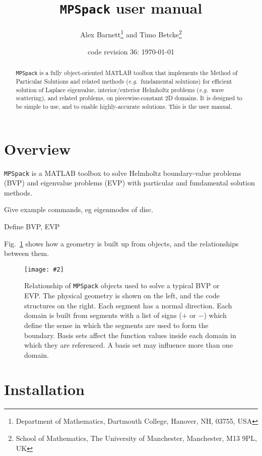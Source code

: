 \documentclass[12pt]{article}
\newcommand{\bfi}{\begin{figure}}
\newcommand{\efi}{\end{figure}}
\newcommand{\ca}[2]{\caption{#1 \label{#2}}}
\newcommand{\ig}[2]{\texttt{[image: \#2]}}
\newcommand{\eg}{{\it e.g.\ }}
\begin{document}
\title{{\tt MPSpack} user manual}
\author{Alex Barnett\footnote{Department of Mathematics, Dartmouth College, Hanover, NH, 03755, USA}
and Timo Betcke\footnote{School
of Mathematics, The University of Manchester,
  Manchester, M13 9PL, UK}}
\date{code revision 36: \today}   %

\maketitle
\begin{abstract}
{\tt MPSpack} is a fully object-oriented MATLAB toolbox that implements the Method of Particular Solutions and related methods (\eg fundamental solutions) for efficient solution of Laplace eigenvalue, interior/exterior Helmholtz problems (\eg wave scattering), and related problems, on piecewise-constant 2D domains.
It is designed to be simple to use, and to enable highly-accurate solutions.
This is the user manual.
\end{abstract}

\section{Overview}

{\tt MPSpack} is a MATLAB toolbox to solve Helmholtz boundary-value
problems (BVP) and
eigenvalue problems (EVP) with particular and fundamental solution methods.

Give example commands, eg eigenmodes of disc.

Define BVP, EVP



Fig.~\ref{f:relat} shows how a geometry is built up from objects, and the
relationships between them.



\bfi %
\ig{width=\textwidth}{relat.eps}
\ca{Relationship of {\tt MPSpack}
objects used to solve a typical BVP or EVP.
The physical geometry is shown on the left, and the code structures on the
right.
Each segment has a normal direction. Each domain is built from
segments with a list of signs ($+$ or $-$) which define the sense in which
the segments are used to form the boundary.
Basis sets affect the function values inside each domain in which they
are referenced. A basis set may influence more than one domain.}{f:relat}
\efi

\section{Installation}
\end{document}
